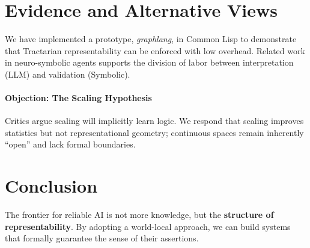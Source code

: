 \documentclass{article}
\begin{document}
\section{Evidence and Alternative Views}

We have implemented a prototype, \textit{graphlang}, in Common Lisp to demonstrate that Tractarian representability can be enforced with low overhead. Related work in neuro-symbolic agents \citep{ibrahim2026, ata2025} supports the division of labor between interpretation (LLM) and validation (Symbolic).

\paragraph{Objection: The Scaling Hypothesis} Critics argue scaling will implicitly learn logic. We respond that scaling improves statistics but not representational geometry; continuous spaces remain inherently ``open'' and lack formal boundaries.

\section{Conclusion}

The frontier for reliable AI is not more knowledge, but the \textbf{structure of representability}. By adopting a world-local approach, we can build systems that formally guarantee the sense of their assertions.



\end{document}
